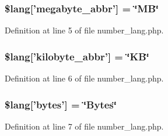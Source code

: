 \subsubsection[{\$lang}]{\setlength{\rightskip}{0pt plus 5cm}\$lang['megabyte\-\_\-abbr'] = \char`\"{}M\-B\char`\"{}}\label{number__lang_8php_ae1fdf8fb2977ddec5fd9f2237f277edc}


Definition at line 5 of file number\-\_\-lang.\-php.

\subsubsection[{\$lang}]{\setlength{\rightskip}{0pt plus 5cm}\$lang['kilobyte\-\_\-abbr'] = \char`\"{}K\-B\char`\"{}}\label{number__lang_8php_a78200289bbf44dce8b0d5f06072379e6}


Definition at line 6 of file number\-\_\-lang.\-php.

\subsubsection[{\$lang}]{\setlength{\rightskip}{0pt plus 5cm}\$lang['bytes'] = \char`\"{}Bytes\char`\"{}}\label{number__lang_8php_aeec8ade1229052ff8627a350480bba9c}


Definition at line 7 of file number\-\_\-lang.\-php.

